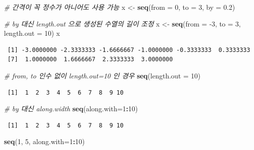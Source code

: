 \documentclass[
  11pt,
]{krantz}
\newenvironment{Shaded}{\begin{snugshade}}{\end{snugshade}}
\newcommand{\CommentTok}[1]{\textcolor[rgb]{0.37,0.37,0.37}{\textit{#1}}}
\newcommand{\DataTypeTok}[1]{\textcolor[rgb]{0.27,0.27,0.27}{#1}}
\newcommand{\DecValTok}[1]{\textcolor[rgb]{0.06,0.06,0.06}{#1}}
\newcommand{\FloatTok}[1]{\textcolor[rgb]{0.06,0.06,0.06}{#1}}
\newcommand{\KeywordTok}[1]{\textcolor[rgb]{0.27,0.27,0.27}{\textbf{#1}}}
\newcommand{\NormalTok}[1]{#1}
\newcommand{\OperatorTok}[1]{\textcolor[rgb]{0.43,0.43,0.43}{\textbf{#1}}}
\newcommand{\StringTok}[1]{\textcolor[rgb]{0.5,0.5,0.5}{#1}}
\begin{document}
\begin{Shaded}
\begin{Highlighting}[]
\CommentTok{# 간격이 꼭 정수가 아니어도 사용 가능}
\NormalTok{x <-}\StringTok{ }\KeywordTok{seq}\NormalTok{(}\DataTypeTok{from =} \DecValTok{0}\NormalTok{, }\DataTypeTok{to =} \DecValTok{3}\NormalTok{, }\DataTypeTok{by =} \FloatTok{0.2}\NormalTok{)}

\CommentTok{# by 대신 length.out 으로 생성된 수열의 길이 조정}
\NormalTok{x <-}\StringTok{ }\KeywordTok{seq}\NormalTok{(}\DataTypeTok{from =} \DecValTok{-3}\NormalTok{, }\DataTypeTok{to =} \DecValTok{3}\NormalTok{, }\DataTypeTok{length.out =} \DecValTok{10}\NormalTok{)}
\NormalTok{x}
\end{Highlighting}
\end{Shaded}

\begin{verbatim}
 [1] -3.0000000 -2.3333333 -1.6666667 -1.0000000 -0.3333333  0.3333333
 [7]  1.0000000  1.6666667  2.3333333  3.0000000
\end{verbatim}

\begin{Shaded}
\begin{Highlighting}[]
\CommentTok{# from, to 인수 없이 length.out=10 인 경우}
\KeywordTok{seq}\NormalTok{(}\DataTypeTok{length.out =} \DecValTok{10}\NormalTok{)}
\end{Highlighting}
\end{Shaded}

\begin{verbatim}
 [1]  1  2  3  4  5  6  7  8  9 10
\end{verbatim}

\begin{Shaded}
\begin{Highlighting}[]
\CommentTok{# by 대신 along.width }
\KeywordTok{seq}\NormalTok{(}\DataTypeTok{along.with=}\DecValTok{1}\OperatorTok{:}\DecValTok{10}\NormalTok{)}
\end{Highlighting}
\end{Shaded}

\begin{verbatim}
 [1]  1  2  3  4  5  6  7  8  9 10
\end{verbatim}

\begin{Shaded}
\begin{Highlighting}[]
\KeywordTok{seq}\NormalTok{(}\DecValTok{1}\NormalTok{, }\DecValTok{5}\NormalTok{, }\DataTypeTok{along.with=}\DecValTok{1}\OperatorTok{:}\DecValTok{10}\NormalTok{)}
\end{Highlighting}
\end{Shaded}
\end{document}
